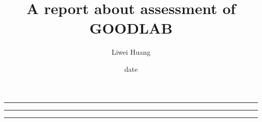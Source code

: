 \documentclass[journal]{IEEEtran}
\begin{document}
\title{A report about assessment of \\GOODLAB}
\author{Liwei Huang}
\date{date}

\maketitle
\rule{\textwidth}{2pt}
\rule{\textwidth}{0pt}
\rule{\textwidth}{0pt}



\end{document}
